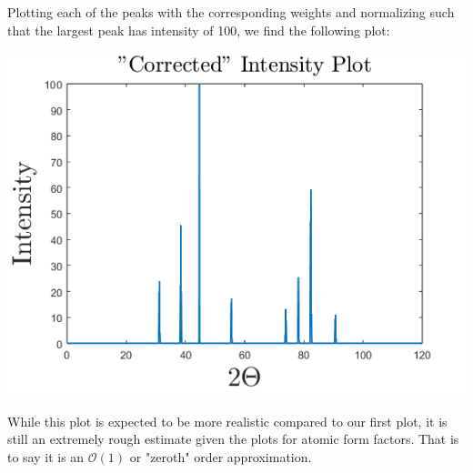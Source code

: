 \documentclass{article}
\begin{document}
\begin{enumerate}
    Plotting each of the peaks with the corresponding weights and normalizing such that the largest peak has intensity of 100, we find the following plot:
    \begin{center}
        \includegraphics[scale = 0.6]{correctedintensity.png}
    \end{center}
    While this plot is expected to be more realistic compared to our first plot, it is still an extremely rough estimate given the plots for atomic form factors. That is to say it is an $\mathcal{O}(1)$ or "zeroth" order approximation.
\end{enumerate}
\end{document}
